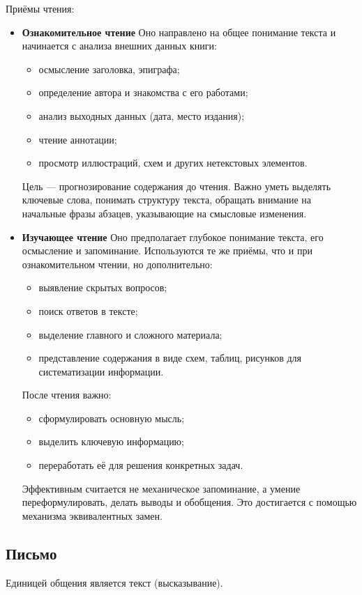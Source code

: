 Приёмы чтения:
\begin{itemize}
	\item \textbf{Ознакомительное чтение}
	Оно направлено на общее понимание текста и начинается с анализа внешних данных книги:
	\begin{itemize}
		\renewcommand{\labelitemi}{--}
		\item осмысление заголовка, эпиграфа;
		\item определение автора и знакомства с его работами;
		\item анализ выходных данных (дата, место издания);
		\item чтение аннотации;
		\item просмотр иллюстраций, схем и других нетекстовых элементов.
	\end{itemize}
	Цель — прогнозирование содержания до чтения. Важно уметь выделять ключевые слова, понимать структуру текста, обращать внимание на начальные фразы абзацев, указывающие на смысловые изменения.
	\item \textbf{Изучающее чтение}
	Оно предполагает глубокое понимание текста, его осмысление и запоминание. Используются те же приёмы, что и при ознакомительном чтении, но дополнительно:
	\begin{itemize}
		\renewcommand{\labelitemi}{--}
		\item выявление скрытых вопросов;
		\item поиск ответов в тексте;
		\item выделение главного и сложного материала;
		\item представление содержания в виде схем, таблиц, рисунков для систематизации информации.
	\end{itemize}
	После чтения важно:
	\begin{itemize}
		\renewcommand{\labelitemi}{--}
		\item сформулировать основную мысль;
		\item выделить ключевую информацию;
		\item переработать её для решения конкретных задач.
	\end{itemize}
	Эффективным считается не механическое запоминание, а умение переформулировать, делать выводы и обобщения. Это достигается с помощью механизма эквивалентных замен.
\end{itemize}

\subsection{Письмо}
Единицей общения является текст (высказывание).

